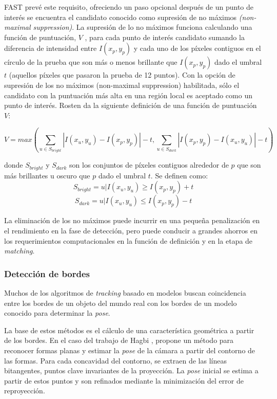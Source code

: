 FAST prevé este requisito, ofreciendo un paso opcional después de un punto de interés se encuentra el candidato conocido como supresión de no máximos \emph{(non-maximal suppression)}. La supresión de lo no máximos funciona calculando una función de puntuación, $V$ , para cada punto de interés candidato sumando la diferencia de intensidad entre $I(x_p,y_p)$ y cada uno de los píxeles contiguos en el círculo de la prueba que son más o menos brillante que $I(x_p , y_p)$  dado el  umbral $t$  (aquellos píxeles que pasaron la prueba de 12 puntos). Con la opción de supresión de los no máximos (non-maximal suppression) habilitada, sólo el candidato con la puntuación más alta en una región local es aceptado como un punto de interés. Rosten \cite{Rosten} da la siguiente definición de una función de puntuación $V$:

\begin{equation}
  V = max\left( \displaystyle \sum_{u\in S_{bright}} \left | I(x_u,y_u) - I(x_p,y_p) \right | -t , \sum_{u\in S_{dark}} \left | I(x_p,y_p) - I(x_u,y_u) \right | -t \right) 
\end{equation}

donde $S_{bright}$ y $S_{dark}$ son los conjuntos de píxeles contiguos alrededor de $p$ que son más brillantes u oscuro que $p$ dado el umbral $t$. Se definen como:
\begin{equation}
  S_{bright} = {{u|I(x_u , y_u ) \geq I(x_p,y_p) + t}}
\end{equation}
\begin{equation}
  S_{dark} = {{u|I(x_u , y_u) \leq I(x_p , y_p ) - t}}
\end{equation}

La eliminación de los no máximos  puede incurrir en una pequeña penalización en el rendimiento en la fase de detección, pero puede conducir a grandes ahorros en los requerimientos computacionales en la función de definición y en la etapa de \emph{matching}.

\subsubsection{Detección de bordes} 
Muchos de los algoritmos de \textit{tracking} basado en modelos buscan coincidencia entre los bordes de un objeto del mundo real con los bordes de un modelo conocido para determinar la \textit{pose}. 

La base de estos métodos es el cálculo de una característica geométrica a partir de los bordes. En el caso del trabajo de Hagbi \cite{Hagbi}, propone un método para reconocer formas planas y estimar la \textit{pose} de la cámara a partir del contorno de las formas. Para cada concavidad del contorno, se extraen de las líneas bitangentes, puntos clave invariantes de la proyección. La \textit{pose} inicial se estima a partir de estos puntos y son refinados mediante la minimización del error de reproyección.

